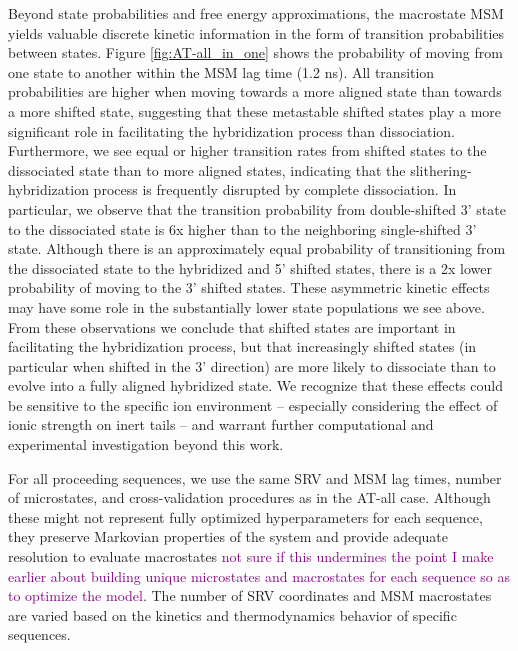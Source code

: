 \documentclass[journal=jpcbfk,manuscript=article]{achemso}
\begin{document}
Beyond state probabilities and free energy approximations, the macrostate MSM yields valuable discrete kinetic information in the form of transition probabilities between states. Figure \ref{fig:AT-all_in_one} shows the probability of moving from one state to another within the MSM lag time (1.2 ns). All transition probabilities are higher when moving towards a more aligned state than towards a more shifted state, suggesting that these metastable shifted states play a more significant role in facilitating the hybridization process than dissociation. Furthermore, we see equal or higher transition rates from shifted states to the dissociated state than to more aligned states, indicating that the slithering-hybridization process is frequently disrupted by complete dissociation. In particular, we observe that the transition probability from double-shifted 3' state to the dissociated state is 6x higher than to the neighboring single-shifted 3' state. Although there is an approximately equal probability of transitioning from the dissociated state to the hybridized and 5' shifted states, there is a 2x lower probability of moving to the 3' shifted states. These asymmetric kinetic effects may have some role in the substantially lower state populations we see above. From these observations we conclude that shifted states are important in facilitating the hybridization process, but that increasingly shifted states (in particular when shifted in the 3' direction) are more likely to dissociate than to evolve into a fully aligned hybridized state. We recognize that these effects could be sensitive to the specific ion environment -- especially considering the effect of ionic strength on inert tails -- and warrant further computational and experimental investigation beyond this work.

For all proceeding sequences, we use the same SRV and MSM lag times, number of microstates, and cross-validation procedures as in the AT-all case. Although these might not represent fully optimized hyperparameters for each sequence, they preserve Markovian properties of the system and provide adequate resolution to evaluate macrostates \textcolor{purple}{not sure if this undermines the point I make earlier about building unique microstates and macrostates for each sequence so as to optimize the model}. The number of SRV coordinates and MSM macrostates are varied based on the kinetics and thermodynamics behavior of specific sequences.

\end{document}

